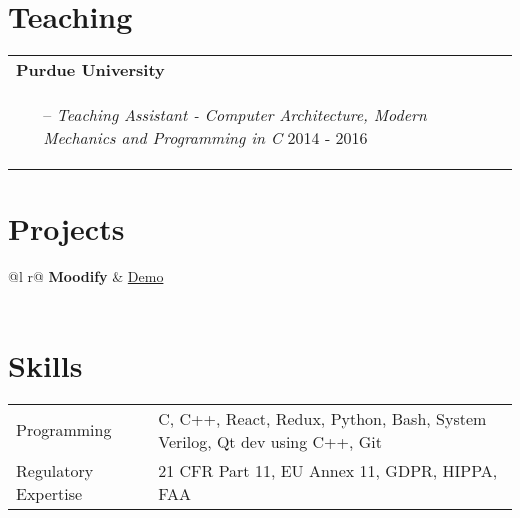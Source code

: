 \documentclass[a4paper,12pt]{article}
\begin{document}
\section{Teaching}
\begin{tabularx}{\linewidth}{ @{}l r@{} }
\textbf{Purdue University} \\[3.75pt]
    \begin{minipage}[t]{\linewidth}
        \begin{itemize}[nosep,after=\strut, leftmargin=1em, itemsep=3pt]
            \item[--] \textit{Teaching Assistant - Computer Architecture, Modern Mechanics and Programming in C} \hfill 2014 - 2016
        \end{itemize}
    \end{minipage}
\end{tabularx}

\section{Projects}
\begin{tabularx}{\linewidth}{ @{}l r@{} }
\textbf{Moodify} & \hfill \href{https://github.com/hthatukuru/Moodify}{Demo} \\[3.75pt]
  \\
\end{tabularx}

\section{Skills}
\begin{tabularx}{\linewidth}{@{}l X@{}}
Programming &  \normalsize{C, C++, React, Redux, Python, Bash, System Verilog, Qt dev using C++, Git}\\
Regulatory Expertise  &  \normalsize{21 CFR Part 11, EU Annex 11, GDPR, HIPPA, FAA}\\  
\end{tabularx}

\vfill
{}
\end{document}
